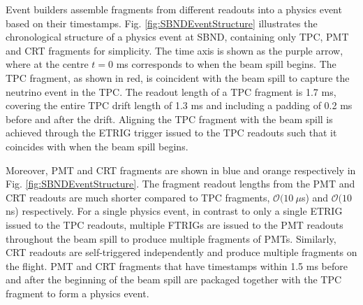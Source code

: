 Event builders assemble fragments from different readouts into a physics event based on their timestamps.
Fig. \ref{fig:SBNDEventStructure} illustrates the chronological structure of a physics event at SBND, containing only TPC, PMT and CRT fragments for simplicity.
The time axis is shown as the purple arrow, where at the centre $t = 0$ ms corresponds to when the beam spill begins.
The TPC fragment, as shown in red, is coincident with the beam spill to capture the neutrino event in the TPC. 
The readout length of a TPC fragment is 1.7 ms, covering the entire TPC drift length of 1.3 ms and including a padding of 0.2 ms before and after the drift. 
Aligning the TPC fragment with the beam spill is achieved through the ETRIG trigger issued to the TPC readouts such that it coincides with when the beam spill begins.



Moreover, PMT and CRT fragments are shown in blue and orange respectively in Fig. \ref{fig:SBNDEventStructure}.
The fragment readout lengths from the PMT and CRT readouts are much shorter compared to TPC fragments, $\mathcal{O}(10\ \mu$s) and $\mathcal{O}(10$ ns) respectively.
For a single physics event, in contrast to only a single ETRIG issued to the TPC readouts, multiple FTRIGs are issued to the PMT readouts throughout the beam spill to produce multiple fragments of PMTs.
Similarly, CRT readouts are self-triggered independently and produce multiple fragments on the flight.
PMT and CRT fragments that have timestamps within 1.5 ms before and after the beginning of the beam spill are packaged together with the TPC fragment to form a physics event.

